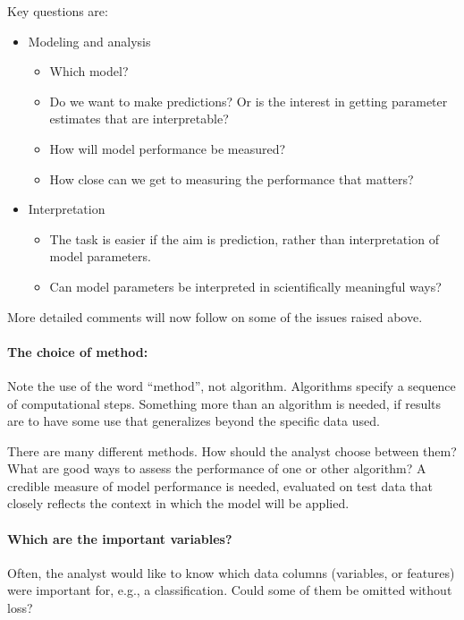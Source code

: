 Key questions are:
\begin{itemize}
\item Modeling and analysis
  \begin{itemize}
    \item Which model?
    \item Do we want to make predictions?  Or is the interest in getting
parameter estimates that are interpretable?
    \item How will model performance be measured?
    \item How close can we get to measuring the performance that matters?
  \end{itemize}
\item Interpretation
  \begin{itemize}
    \item The task is easier if the aim is prediction, rather than
interpretation of model parameters.
    \item Can model parameters be interpreted in scientifically meaningful
      ways?
  \end{itemize}
\end{itemize}

More detailed comments will now follow on some of the issues raised above.

\paragraph{The choice of  method:} Note the use of the word ``method'',
not algorithm. Algorithms specify a sequence of computational steps.
Something more than an algorithm is needed, if results are to have
some use that generalizes beyond the specific data used.

There are many different methods. How should the analyst
choose between them?  What are good ways to assess the performance of
one or other algorithm? A credible measure of model performance is
needed, evaluated on test data that closely reflects the context in
which the model will be applied.

\paragraph{Which are the important variables?} Often, the analyst
would like to know which data columns (variables, or features) were
important for, e.g., a classification.  Could some of them be omitted
without loss?

